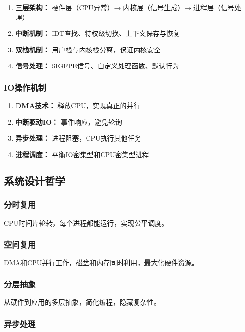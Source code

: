 \documentclass[UTF8,a4paper,12pt]{ctexart}
\begin{document}
\begin{enumerate}[leftmargin=2em]
    \item \textbf{三层架构：} 硬件层（CPU异常）→ 内核层（信号生成）→ 进程层（信号处理）
    \item \textbf{中断机制：} IDT查找、特权级切换、上下文保存与恢复
    \item \textbf{双栈机制：} 用户栈与内核栈分离，保证内核安全
    \item \textbf{信号处理：} SIGFPE信号、自定义处理函数、默认行为
\end{enumerate}

\subsubsection{IO操作机制}

\begin{enumerate}[leftmargin=2em]
    \item \textbf{DMA技术：} 释放CPU，实现真正的并行
    \item \textbf{中断驱动IO：} 事件响应，避免轮询
    \item \textbf{异步处理：} 进程阻塞，CPU执行其他任务
    \item \textbf{进程调度：} 平衡IO密集型和CPU密集型进程
\end{enumerate}

\subsection{系统设计哲学}

\subsubsection{分时复用}

CPU时间片轮转，每个进程都能运行，实现公平调度。

\subsubsection{空间复用}

DMA和CPU并行工作，磁盘和内存同时利用，最大化硬件资源。

\subsubsection{分层抽象}

从硬件到应用的多层抽象，简化编程，隐藏复杂性。

\subsubsection{异步处理}
\end{document}
